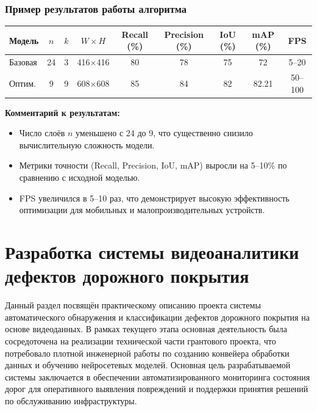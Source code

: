 \documentclass[a4paper,12pt]{article}
\begin{document}
\subsubsection*{Пример результатов работы алгоритма}

\begin{center}
\normalsize
\setlength{\tabcolsep}{4pt} %
\begin{tabular}{|l|c|c|c|c|c|c|c|c|}
\hline
Модель & $n$ & $k$ & $W \times H$ & Recall (\%) & Precision (\%) & IoU (\%) & mAP (\%) & FPS \\
\hline
Базовая & 24 & 3 & 416×416 & 80 & 78 & 75 & 72 & 5–20 \\
Оптим. & 9 & 9 & 608×608 & 85 & 84 & 82 & 82.21 & 50–100 \\
\hline
\end{tabular}
\end{center} \cite{taema}

\textbf{Комментарий к результатам:}  

\begin{itemize}
    \item Число слоёв $n$ уменьшено с 24 до 9, что существенно снизило вычислительную сложность модели.
    \item Метрики точности (Recall, Precision, IoU, mAP) выросли на 5–10\% по сравнению с исходной моделью.
    \item FPS увеличился в 5–10 раз, что демонстрирует высокую эффективность оптимизации для мобильных и малопроизводительных устройств.
\end{itemize}

\newpage

\section{Разработка системы видеоаналитики дефектов дорожного покрытия}

Данный раздел посвящён практическому описанию проекта системы автоматического обнаружения и классификации дефектов дорожного покрытия на основе видеоданных. В рамках текущего этапа основная деятельность была сосредоточена на реализации технической части грантового проекта, что потребовало плотной инженерной работы по созданию конвейера обработки данных и обучению нейросетевых моделей. Основная цель разрабатываемой системы заключается в обеспечении автоматизированного мониторинга состояния дорог для оперативного выявления повреждений и поддержки принятия решений по обслуживанию инфраструктуры. 
\end{document}
